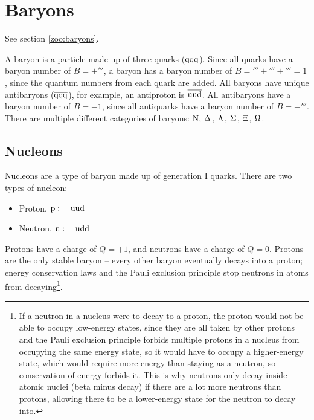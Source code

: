     \section{Baryons}
        See section \ref{zoo:baryons}.

        A baryon is a particle made up of three quarks ($\baryonquarks[qqq]$).
        Since all quarks have a baryon number of $B=+\third$, a baryon has a baryon number of $B=\third+\third+\third=1$, since the quantum numbers from each quark are added.
        All baryons have unique antibaryons ($\antibaryonquarks[qqq]$), for example, an antiproton is $\antibaryonquarks[uud]$.
        All antibaryons have a baryon number of $B=-1$, since all antiquarks have a baryon number of $B=-\third$.
        There are multiple different categories of baryons: N, $\deltabaryon$, $\lambdabaryon$, $\sigmabaryon$, $\xibaryon$, $\omegabaryon$.

        \subsection{Nucleons}
            Nucleons are a type of baryon made up of generation I quarks.
            There are two types of nucleon:
            \begin{itemize}
                \item Proton, $\proton:\quad\baryonquarks[uud]$
                \item Neutron, $\neutron:\quad\baryonquarks[udd]$
            \end{itemize}

            Protons have a charge of $Q=+1$, and neutrons have a charge of $Q=0$.
            Protons are the only stable baryon -- every other baryon eventually decays into a proton; energy conservation laws and the Pauli exclusion principle stop neutrons in atoms from decaying\footnote{If a neutron in a nucleus were to decay to a proton, the proton would not be able to occupy low-energy states, since they are all taken by other protons and the Pauli exclusion principle forbids multiple protons in a nucleus from occupying the same energy state, so it would have to occupy a higher-energy state, which would require more energy than staying as a neutron, so conservation of energy forbids it. This is why neutrons only decay inside atomic nuclei (beta minus decay) if there are a lot more neutrons than protons, allowing there to be a lower-energy state for the neutron to decay into.}.

